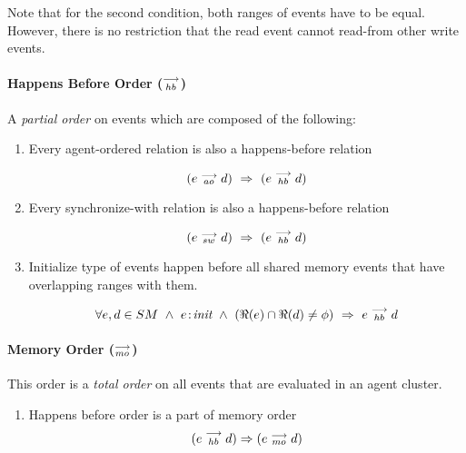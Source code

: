              {Note that for the second condition, both ranges of events have to be equal. However, there is no restriction that the read event cannot read-from other write events.}
            
        \paragraph{Happens Before Order ($\stackrel{\longrightarrow}{_{hb}}$)}
             A \textit{partial order} on events which are composed of the following:
            
            \begin{enumerate}
                \item Every agent-ordered relation is also a happens-before relation 
              
                    \[(e \stackrel{\longrightarrow}{_{ao}} d) \ \Rightarrow{} \ (e \stackrel{\longrightarrow}{_{hb}} d)\]
              
                \item Every synchronize-with relation is also a happens-before relation 
              
                    \[(e \stackrel{\longrightarrow}{_{sw}} d) \ \Rightarrow{} \ (e \stackrel{\longrightarrow}{_{hb}} d)\]
                     
                \item Initialize type of events happen before all shared memory events that have overlapping ranges with them. 
                
                    \[
                        \forall e,d \in SM \ \wedge \ 
                        \et{e}{init} \ \wedge \ 
                        (\Re(e) \cap \Re(d) \neq \phi)
                        \ \Rightarrow{} \ 
                        e \stck{_{hb}} d
                    \]
            \end{enumerate}
        
        
        \paragraph{Memory Order ($\stackrel{\longrightarrow}{_{mo}}$)}
            This order is a \textit{total order} on all events that are evaluated in an agent cluster. 
            \begin{enumerate}
                \item Happens before order is a part of memory order
                    \[(e \stackrel{\longrightarrow}{_{hb}} d) \Rightarrow{} (e \stackrel{\longrightarrow}{_{mo}} d)\]
            \end{enumerate}